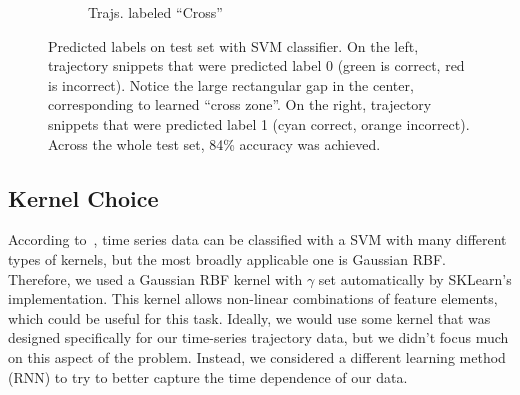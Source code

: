 \begin{figure}
\begin{subfigure}{.25\textwidth}
  \caption{Trajs. labeled ``Cross''}
  \label{fig:svm_label1}
\end{subfigure}
\caption{Predicted labels on test set with SVM classifier. On the left, trajectory snippets that were predicted label 0 (green is correct, red is incorrect). Notice the large rectangular gap in the center, corresponding to learned ``cross zone''. On the right, trajectory snippets that were predicted label 1 (cyan correct, orange incorrect). Across the whole test set, 84\% accuracy was achieved.}
\label{fig:svm_labels}
\end{figure}

\subsection{Kernel Choice}
According to~\cite{Rüping01svmkernels}, time series data can be classified with a SVM with many different types of kernels, but the most broadly applicable one is Gaussian RBF.
Therefore, we used a Gaussian RBF kernel with $\gamma$ set automatically by SKLearn's implementation.
This kernel allows non-linear combinations of feature elements, which could be useful for this task.
Ideally, we would use some kernel that was designed specifically for our time-series trajectory data, but we didn't focus much on this aspect of the problem.
Instead, we considered a different learning method (RNN) to try to better capture the time dependence of our data.





